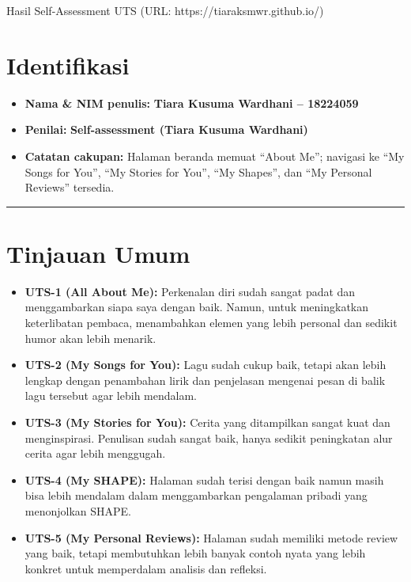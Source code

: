 \documentclass[
  letterpaper,
  DIV=11,
  numbers=noendperiod]{scrreprt}
\providecommand{\tightlist}{%
  \setlength{\itemsep}{0pt}\setlength{\parskip}{0pt}}
\begin{document}
Hasil Self-Assessment UTS (URL: https://tiaraksmwr.github.io/)

\section{Identifikasi}\label{identifikasi}

\begin{itemize}
\tightlist
\item
  \textbf{Nama \& NIM penulis:} \textbf{Tiara Kusuma Wardhani --
  18224059}\\
\item
  \textbf{Penilai:} \textbf{Self-assessment (Tiara Kusuma Wardhani)}\\
\item
  \textbf{Catatan cakupan:} Halaman beranda memuat ``About Me'';
  navigasi ke ``My Songs for You'', ``My Stories for You'', ``My
  Shapes'', dan ``My Personal Reviews'' tersedia.
\end{itemize}

\begin{center}\rule{0.5\linewidth}{0.5pt}\end{center}

\section{Tinjauan Umum}\label{tinjauan-umum}

\begin{itemize}
\tightlist
\item
  \textbf{UTS-1 (All About Me):} Perkenalan diri sudah sangat padat dan
  menggambarkan siapa saya dengan baik. Namun, untuk meningkatkan
  keterlibatan pembaca, menambahkan elemen yang lebih personal dan
  sedikit humor akan lebih menarik.\\
\item
  \textbf{UTS-2 (My Songs for You):} Lagu sudah cukup baik, tetapi akan
  lebih lengkap dengan penambahan lirik dan penjelasan mengenai pesan di
  balik lagu tersebut agar lebih mendalam.\\
\item
  \textbf{UTS-3 (My Stories for You):} Cerita yang ditampilkan sangat
  kuat dan menginspirasi. Penulisan sudah sangat baik, hanya sedikit
  peningkatan alur cerita agar lebih menggugah.\\
\item
  \textbf{UTS-4 (My SHAPE):} Halaman sudah terisi dengan baik namun
  masih bisa lebih mendalam dalam menggambarkan pengalaman pribadi yang
  menonjolkan SHAPE.\\
\item
  \textbf{UTS-5 (My Personal Reviews):} Halaman sudah memiliki metode
  review yang baik, tetapi membutuhkan lebih banyak contoh nyata yang
  lebih konkret untuk memperdalam analisis dan refleksi.
\end{itemize}
\end{document}
